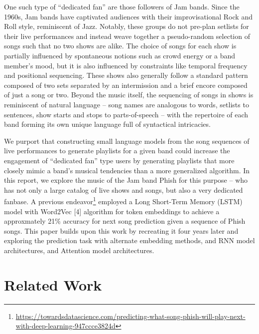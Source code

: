 \documentclass{article}
\begin{document}
One such type of “dedicated fan” are those followers of Jam bands. Since the 1960s, Jam bands have captivated audiences with their improvisational Rock and Roll style, reminiscent of Jazz. Notably, these groups do not pre-plan setlists for their live performances and instead weave together a pseudo-random selection of songs such that no two shows are alike. The choice of songs for each show is partially influenced by spontaneous notions such as crowd energy or a band member’s mood, but it is also influenced by constraints like temporal frequency and positional sequencing. These shows also generally follow a standard pattern composed of two sets separated by an intermission and a brief encore composed of just a song or two. Beyond the music itself, the sequencing of songs in shows is reminiscent of natural language – song names are analogous to words, setlists to sentences, show starts and stops to parts-of-speech – with the repertoire of each band forming its own unique language full of syntactical intricacies.  

We purport that constructing small language models from the song sequences of live performances to generate playlists for a given band could increase the engagement of “dedicated fan” type users by generating playlists that more closely mimic a band’s musical tendencies than a more generalized algorithm. In this report, we explore the music of the Jam band Phish for this purpose – who has not only a large catalog of live shows and songs, but also a very dedicated fanbase. A previous endeavor\footnote{\url{https://towardsdatascience.com/predicting-what-song-phish-will-play-next-with-deep-learning-947ccce3824d}} employed a Long Short-Term Memory (LSTM) model with Word2Vec [4] algorithm for token embeddings to achieve a approxmately 21\% accuracy for next song prediction given a sequence of Phish songs. This paper builds upon this work by recreating it four years later and exploring the prediction task with alternate embedding methods, and RNN model architectures, and Attention model architectures. 

\section{Related Work}
\end{document}
